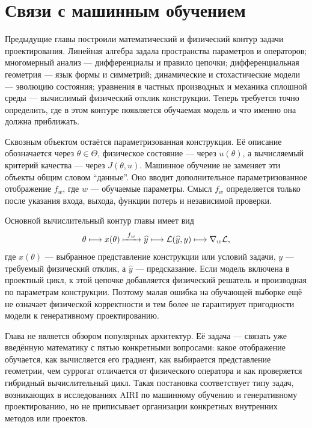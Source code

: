 %
\chapter{Связи с машинным обучением}
\label{chap:connections-machine-learning}
Предыдущие главы построили математический и физический контур задачи проектирования. Линейная алгебра задала пространства параметров и операторов; многомерный анализ --- дифференциалы и правило цепочки; дифференциальная геометрия --- язык формы и симметрий; динамические и стохастические модели --- эволюцию состояния; уравнения в частных производных и механика сплошной среды --- вычислимый физический отклик конструкции. Теперь требуется точно определить, где в этом контуре появляется обучаемая модель и что именно она должна приближать.

Сквозным объектом остаётся параметризованная конструкция. Её описание обозначается через $\theta\in\Theta$, физическое состояние --- через $u(\theta)$, а вычисляемый критерий качества --- через $J(\theta,u)$. Машинное обучение не заменяет эти объекты общим словом ``данные''. Оно вводит дополнительное параметризованное отображение $f_w$, где $w$ --- обучаемые параметры. Смысл $f_w$ определяется только после указания входа, выхода, функции потерь и независимой проверки.

Основной вычислительный контур главы имеет вид
\begin{equation}
 \theta
 \longmapsto
 x(\theta)
 \xmapsto{\ f_w\ }
 \widehat y
 \longmapsto
 \mathcal L(\widehat y,y)
 \longmapsto
 \nabla_w\mathcal L,
\end{equation}
где $x(\theta)$ --- выбранное представление конструкции или условий задачи, $y$ --- требуемый физический отклик, а $\widehat y$ --- предсказание. Если модель включена в проектный цикл, к этой цепочке добавляется физический решатель и производная по параметрам конструкции. Поэтому малая ошибка на обучающей выборке ещё не означает физической корректности и тем более не гарантирует пригодности модели к генеративному проектированию.

Глава не является обзором популярных архитектур. Её задача --- связать уже введённую математику с пятью конкретными вопросами: какое отображение обучается, как вычисляется его градиент, как выбирается представление геометрии, чем суррогат отличается от физического оператора и как проверяется гибридный вычислительный цикл. Такая постановка соответствует типу задач, возникающих в исследованиях AIRI по машинному обучению и генеративному проектированию, но не приписывает организации конкретных внутренних методов или проектов.

